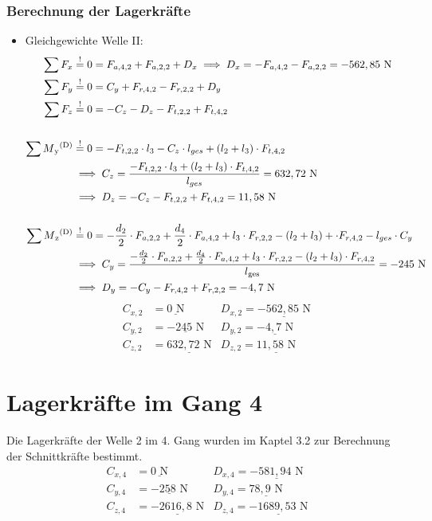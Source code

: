\subsubsection{Berechnung der Lagerkräfte}
\begin{itemize}
	\item Gleichgewichte Welle II:
	\begin{align*}
	\sum F_x &\overset{!}{=} 0 = F_{a,4,2} +F_{a,2,2} + D_x \implies D_x = -F_{a,4,2} -F_{a,2,2}= -562,85 \text{ N} \\
	\sum F_y &\overset{!}{=} 0 = C_y +F_{r,4,2}- F_{r,2,2}+D_y \\ 
	\sum F_z &\overset{!}{=} 0 = - C_z - D_z - F_{t,2,2} + F_{t,4,2} \\ \\
	\sum M\textsubscript{y}\textsuperscript{(D)} &\overset{!}{=} 0 = - F_{t,2,2} \cdot l_3 - C_z \cdot l_{ges} +(l_2 + l_3) \cdot F_{t,4,2} \\ 
	&\implies C_z = \frac{- F_{t,2,2} \cdot l_3 + (l_2+l_3) \cdot F_{t,4,2} }{l_{ges}} = 632,72 \text { N} \\ 
	& \implies D_z = - C_z - F_{t,2,2} + F_{t,4,2}= 11,58 \text{ N}\\ \\
	\sum M\textsubscript{z}\textsuperscript{(D)} &\overset{!}{=} 0 = - \frac{d_2}{2} \cdot F_{a,2,2} + \frac{d_4}{2} \cdot F_{a,4,2} + l_3 \cdot F_{r,2,2} - (l_2 + l_3)+ \cdot F_{r,4,2}- l_{ges} \cdot C_y  \\ 
	&\implies C_y = \frac{- \frac{d_2}{2} \cdot F_{a,2,2} + \frac{d_4}{2} \cdot F_{a,4,2}  + l_3 \cdot F_{r,2,2} - (l_2 + l_3) \cdot F_{r,4,2}}{l\textsubscript{ges}} = -245 \text{ N}\\ 
	& \implies D_y =  - C_y - F_{r,4,2} + F_{r,2,2} = -4,7\text{ N}
	\end{align*}
	\begin{align*}
	C_{x,2} &= \underline{0\text{ N}} & D_{x,2}= \underline{-562,85\text{ N}}\\
	C_{y,2} &= \underline{-245\text{ N}} & D_{y,2}= \underline{-4,7\text{ N}}\\
	C_{z,2} &= \underline{632,72\text{ N}} & D_{z,2}= \underline{11,58\text{ N}}
	\end{align*}
\end{itemize}
\section{Lagerkräfte im Gang 4}
Die Lagerkräfte der Welle 2 im 4. Gang wurden im Kaptel 3.2 zur Berechnung der Schnittkräfte bestimmt.
\begin{align*}
	C_{x,4} &= \underline{0\text{ N}} & D_{x,4}= \underline{-581,94\text{ N}}\\
	C_{y,4} &= \underline{-258\text{ N}} & D_{y,4}= \underline{78,9\text{ N}}\\
	C_{z,4} &= \underline{-2616,8\text{ N}} & D_{z,4}= \underline{-1689,53\text{ N}}
\end{align*}
